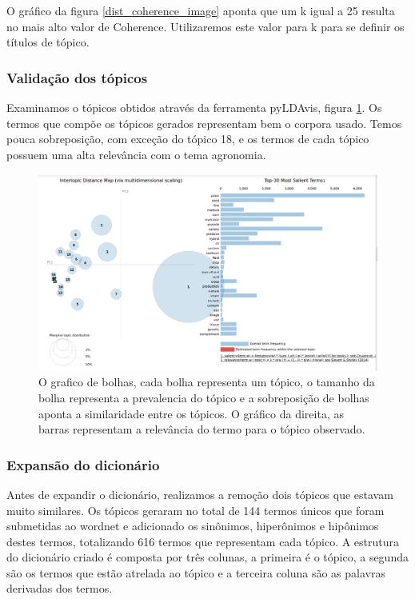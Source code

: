 O gráfico da figura \ref{dist_coherence_image} aponta que um k igual a 25 resulta no mais alto valor de Coherence. Utilizaremos este valor para k para se definir os títulos de tópico.

\subsubsection{Validação dos tópicos}

Examinamos o tópicos obtidos através da ferramenta pyLDAvis, figura \ref{pyLDAvis_image}. Os termos que compõe os tópicos gerados  representam bem o corpora usado. Temos pouca sobreposição, com exceção do tópico 18, e os termos de cada tópico possuem uma alta relevância com o tema agronomia.  

\begin{figure}[ht!]
	\centering
	\includegraphics[scale=0.4]{imagens/construcao_dicionario.png}
	\caption{O grafico de bolhas, cada bolha representa um tópico, o tamanho da bolha representa a prevalencia do tópico e a sobreposição de bolhas aponta a similaridade entre os tópicos. O gráfico da direita, as barras representam a relevância do termo para o tópico observado.
			 \label{pyLDAvis_image}}
\end{figure}

\subsubsection{Expansão do dicionário}

Antes de expandir o dicionário, realizamos a remoção dois tópicos que estavam muito similares. Os tópicos geraram no total de 144 termos únicos que foram submetidas ao wordnet e adicionado os sinônimos, hiperônimos e hipônimos destes termos, totalizando 616 termos que representam cada tópico. A estrutura do dicionário criado é composta por três colunas, a primeira é o tópico, a segunda são os termos que estão atrelada ao tópico e a terceira coluna são as palavras derivadas dos termos.

